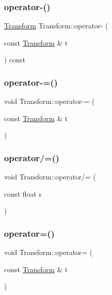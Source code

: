 \subsubsection{\texorpdfstring{operator-\/()}{operator-()}}
{\footnotesize\ttfamily \mbox{\hyperlink{class_transform}{Transform}} Transform\+::operator-\/ (\begin{DoxyParamCaption}\item[{const \mbox{\hyperlink{class_transform}{Transform}} \&}]{t }\end{DoxyParamCaption}) const}

\mbox{\label{class_transform_a204ee3471c1d08188076e3645c9f3517}} 
\subsubsection{\texorpdfstring{operator-\/=()}{operator-=()}}
{\footnotesize\ttfamily void Transform\+::operator-\/= (\begin{DoxyParamCaption}\item[{const \mbox{\hyperlink{class_transform}{Transform}} \&}]{t }\end{DoxyParamCaption})}

\mbox{\label{class_transform_aa38455bbe5aed5f9dfd98a8d3b8a24ec}} 
\subsubsection{\texorpdfstring{operator/=()}{operator/=()}}
{\footnotesize\ttfamily void Transform\+::operator/= (\begin{DoxyParamCaption}\item[{const float}]{s }\end{DoxyParamCaption})}

\mbox{\label{class_transform_af1a25489903986022218a798e4f40251}} 
\subsubsection{\texorpdfstring{operator=()}{operator=()}}
{\footnotesize\ttfamily void Transform\+::operator= (\begin{DoxyParamCaption}\item[{const \mbox{\hyperlink{class_transform}{Transform}} \&}]{t }\end{DoxyParamCaption})}

